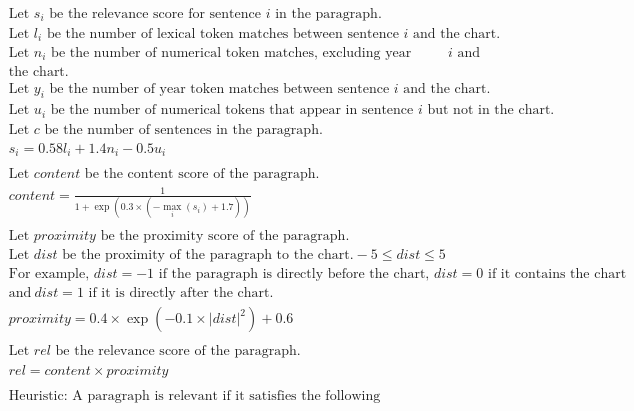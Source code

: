 \begin{figure}
\centering
\begin{equation*}
    \begin{split}
        & \text{Let }s_i\text{ be the relevance score for sentence }i\text{ in the paragraph.}\\
        & \text{Let }l_i\text{ be the number of lexical token matches between sentence }i\text{ and the chart.}\\
        & \text{Let }n_i\text{ be the number of numerical token matches, excluding year tokens, between sentence }i\text{ and} \\ &\text{the chart.}\\
        & \text{Let }y_i\text{ be the number of year token matches between sentence }i\text{ and the chart.}\\
        & \text{Let }u_i\text{ be the number of numerical tokens that appear in sentence }i\text{ but not in the chart.}\\
        & \text{Let }c\text{ be the number of sentences in the paragraph.}\\
        & s_i = 0.58l_i + 1.4n_i - 0.5u_i \\
        \\
        & \text{Let }content\text{ be the content score of the paragraph.}\\
        & content = \frac{1}{1 + \exp{\left(0.3 \times \left(-\underset{i}{\max}\left(s_i\right) + 1.7\right)\right)}} \\
        \\
        & \text{Let }proximity\text{ be the proximity score of the paragraph.}\\
        & \text{Let }dist\text{ be the proximity of the paragraph to the chart.} -5 \leq dist \leq 5\\
        & \text{For example, }dist = -1\text{ if the paragraph is directly before the chart, }dist = 0\text{ if it contains the chart }\\
        & \text{and}~ dist = 1 \text{ if it is directly after the chart.}\\
        & proximity = 0.4 \times \exp{\left(-0.1 \times {\lvert dist \rvert}^2\right)} + 0.6\\
        \\
        & \text{Let }rel\text{ be the relevance score of the paragraph.}\\
        & rel = content \times proximity\\
        \\
        & \text{Heuristic: A paragraph is relevant if it satisfies the following conditions:}\\

\end{split}
\end{equation*}
\end{figure}

